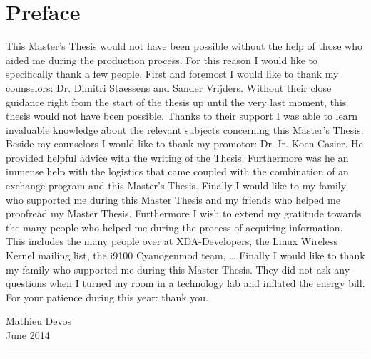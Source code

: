 \chapter*{Preface}


This Master's Thesis would not have been possible without the help of those who aided me during the production process. For this reason I would like to specifically thank a few people.
\npar
First and foremost I would like to thank my counselors: Dr. Dimitri Staessens and Sander Vrijders. Without their close guidance right from the start of the thesis up until the very last moment, this thesis would not have been possible. Thanks to their support I was able to learn invaluable knowledge about the relevant subjects concerning this Master's Thesis. 
\\
Beside my counselors I would like to thank my promotor: Dr. Ir. Koen Casier. He provided helpful advice with the writing of the Thesis. Furthermore was he an immense help with the logistics that came coupled with the combination of an exchange program and this Master's Thesis. 
\npar
Finally I would like to my family who supported me during this Master Thesis and my friends who helped me proofread my Master Thesis. Furthermore I wish to extend my gratitude towards the many people who helped me during the process of acquiring information. This includes the many people over at XDA-Developers, the Linux Wireless Kernel mailing list, the i9100 Cyanogenmod team, \ldots
\npar
Finally I would like to thank my family who supported me during this Master Thesis. They did not ask any questions when I turned my room in a technology lab and inflated the energy bill. For your patience during this year: thank you.

\vfill

\begin{flushright}
	Mathieu Devos
	\\
	June 2014 \\
	\rule{90pt}{0.4pt}
\end{flushright}
